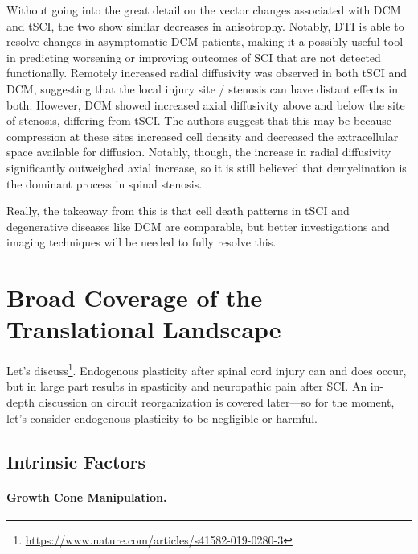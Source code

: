\documentclass[12pt]{report}
\begin{document}
Without going into the great detail on the vector changes associated with DCM and tSCI, the two show similar decreases in anisotrophy. Notably, DTI is able to resolve changes in asymptomatic DCM patients, making it a possibly useful tool in predicting worsening or improving outcomes of SCI that are not detected functionally. Remotely increased radial diffusivity was observed in both tSCI and DCM, suggesting that the local injury site / stenosis can have distant effects in both. However, DCM showed increased axial diffusivity above and below the site of stenosis, differing from tSCI. The authors suggest that this may be because compression at these sites increased cell density and decreased the extracellular space available for diffusion. Notably, though, the increase in radial diffusivity significantly outweighed axial increase, so it is still believed that demyelination is the dominant process in spinal stenosis.\newline

Really, the takeaway from this is that cell death patterns in tSCI and degenerative diseases like DCM are comparable, but better investigations and imaging techniques will be needed to fully resolve this. 







\chapter{Broad Coverage of the Translational Landscape}

\label{sec:TranslationalLandscape}

Let's discuss\footnote{\url{https://www.nature.com/articles/s41582-019-0280-3}}. Endogenous plasticity after spinal cord injury can and does occur, but in large part results in spasticity and neuropathic pain after SCI. An in-depth discussion on circuit reorganization is covered later---so for the moment, let's consider endogenous plasticity to be negligible or harmful.\newline

\section{Intrinsic Factors}

\subsubsection{Growth Cone Manipulation.}
\end{document}
